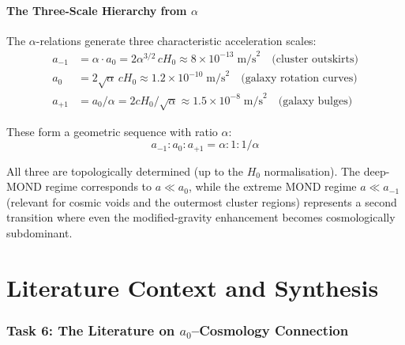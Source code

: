 \documentclass[12pt,a4paper]{article}
\newcommand{\Hzero}{H_0}
\newcommand{\ee}[1]{\times 10^{#1}}
\begin{document}
\subsection{The Three-Scale Hierarchy from $\alpha$}

The $\alpha$-relations generate three characteristic acceleration scales:
\begin{align}
a_{-1} &= \alpha \cdot a_0 = 2\alpha^{3/2}\,c\Hzero
\approx 8 \ee{-13}\;\mathrm{m/s}^2
\quad\text{(cluster outskirts)} \\
a_0 &= 2\sqrt{\alpha}\,c\Hzero
\approx 1.2 \ee{-10}\;\mathrm{m/s}^2
\quad\text{(galaxy rotation curves)} \\
a_{+1} &= a_0/\alpha = 2c\Hzero/\sqrt{\alpha}
\approx 1.5 \ee{-8}\;\mathrm{m/s}^2
\quad\text{(galaxy bulges)}
\end{align}

These form a geometric sequence with ratio $\alpha$:
\begin{equation}
a_{-1} : a_0 : a_{+1} = \alpha : 1 : 1/\alpha
\end{equation}

All three are topologically determined (up to the $\Hzero$ normalisation).
The deep-MOND regime corresponds to $a \ll a_0$, while the extreme MOND
regime $a \ll a_{-1}$ (relevant for cosmic voids and the outermost cluster
regions) represents a second transition where even the modified-gravity
enhancement becomes cosmologically subdominant.


\part{Literature Context and Synthesis}


\section{Task 6: The Literature on $a_0$--Cosmology Connection}
\label{sec:literature}

\end{document}
